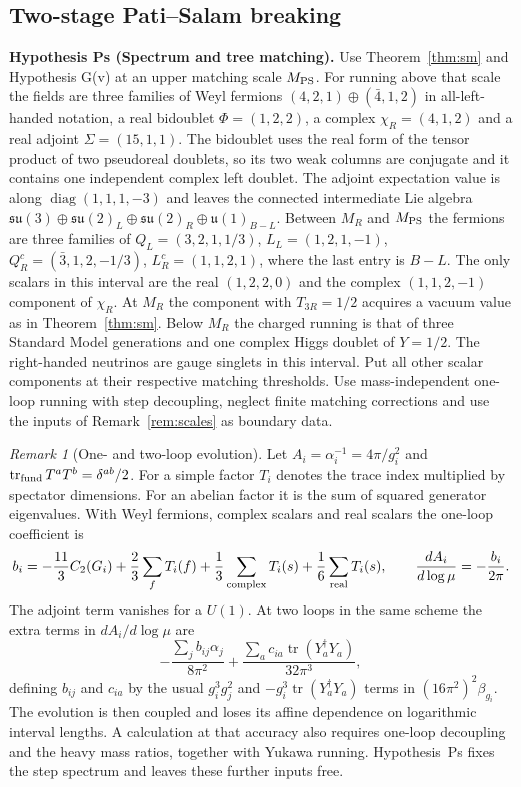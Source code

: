 \documentclass[aps,pra,onecolumn,superscriptaddress,nofootinbib,10pt]{revtex4-2}
\theoremstyle{definition}
\theoremstyle{remark}
\newtheorem{remark}[theorem]{Remark}
\begin{document}
\subsection{Two-stage Pati--Salam breaking}

\smallskip\noindent\textbf{Hypothesis Ps (Spectrum and tree matching).}  Use Theorem~\ref{thm:sm} and Hypothesis G(v) at an upper matching scale
$M_{\rm PS}$. For running above that scale the fields are three families of
Weyl fermions $(4,2,1)\oplus(\bar4,1,2)$ in all-left-handed notation,
a real bidoublet $\Phi=(1,2,2)$, a complex $\chi_R=(4,1,2)$ and
a real adjoint $\Sigma=(15,1,1)$. The bidoublet uses the real form of
the tensor product of two pseudoreal doublets, so its two weak columns
are conjugate and it contains one independent complex left doublet.
The adjoint expectation value is along
$\operatorname{diag}(1,1,1,-3)$ and leaves the connected intermediate Lie algebra
$\mathfrak{su}(3)\oplus\mathfrak{su}(2)_L\oplus\mathfrak{su}(2)_R
\oplus\mathfrak u(1)_{B-L}$. Between $M_R$ and $M_{\rm PS}$ the fermions
are three families of $Q_L=(3,2,1,1/3)$, $L_L=(1,2,1,-1)$,
$Q_R^c=(\bar3,1,2,-1/3)$, $L_R^c=(1,1,2,1)$, where the last entry is
$B-L$. The only scalars in this interval are the real $(1,2,2,0)$
and the complex $(1,1,2,-1)$ component of $\chi_R$. At $M_R$ the
component with $T_{3R}=1/2$ acquires a vacuum value as in Theorem~\ref{thm:sm}.
Below $M_R$ the charged running is that of three Standard Model generations
and one complex Higgs doublet of $Y=1/2$. The right-handed neutrinos are
gauge singlets in this interval. Put all other scalar components at their
respective matching thresholds. Use mass-independent one-loop running with
step decoupling, neglect finite matching corrections and use the inputs
of Remark~\ref{rem:scales} as boundary data.


\begin{remark}[One- and two-loop evolution]\label{ub:beta}
Let $A_i=\alpha_i^{-1}=4\pi/g_i^2$ and
$\operatorname{tr}_{\rm fund}T^aT^b=\delta^{ab}/2$.
For a simple factor $T_i$ denotes the trace index multiplied by spectator
dimensions. For an abelian factor it is the sum of squared generator
eigenvalues. With Weyl fermions, complex scalars and real scalars the
one-loop coefficient is
\[
 b_i=-\frac{11}{3}C_2(G_i)+\frac23\sum_f T_i(f)
                  +\frac13\sum_{\rm complex}T_i(s)+\frac16\sum_{\rm real}T_i(s),
 \qquad \frac{dA_i}{d\log\mu}=-\frac{b_i}{2\pi}.
\]
The adjoint term vanishes for a $U(1)$. At two loops in the same
scheme the extra terms in $dA_i/d\log\mu$ are
\[
 -\frac{\sum_j b_{ij}\alpha_j}{8\pi^2}
 +\frac{\sum_a c_{ia}\operatorname{tr}(Y_a^\dagger Y_a)}{32\pi^3},
\]
defining $b_{ij}$ and $c_{ia}$ by the usual $g_i^3 g_j^2$ and
$-g_i^3\operatorname{tr}(Y_a^\dagger Y_a)$ terms in $(16\pi^2)^2\beta_{g_i}$.
The evolution is then coupled and loses its affine dependence on
logarithmic interval lengths. A calculation at that accuracy also requires
one-loop decoupling and the heavy mass ratios, together with Yukawa running.
Hypothesis~Ps fixes the step spectrum and leaves these further
inputs free. \cite{ub:mv83,ub:mv84,ub:lx}
\end{remark}
\end{document}
